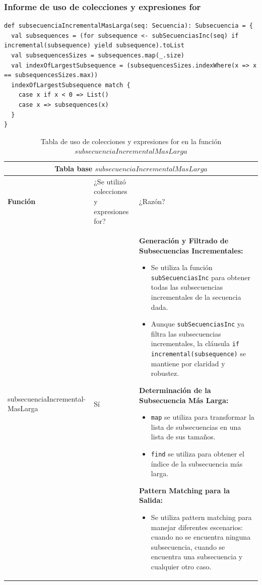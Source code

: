 \documentclass[12pt, a4paper]{article}
\begin{document}
\subsubsection{Informe de uso de colecciones y expresiones for}
\begin{lstlisting}[caption=Código en Scala para la funcion subsecuenciaIncrementalMasLarga, label=lst:scala_code]
def subsecuenciaIncrementalMasLarga(seq: Secuencia): Subsecuencia = {
  val subsequences = (for subsequence <- subSecuenciasInc(seq) if incremental(subsequence) yield subsequence).toList
  val subsequencesSizes = subsequences.map(_.size) 
  val indexOfLargestSubsequence = (subsequencesSizes.indexWhere(x => x == subsequencesSizes.max))
  indexOfLargestSubsequence match {
    case x if x < 0 => List()
    case x => subsequences(x)
  }
}
                      \end{lstlisting}
\begin{table}[H]
    \scriptsize
   \begin{tabular}{ |p{4cm}|p{3cm}|p{5.5cm}|  }
    \hline
    \multicolumn{3}{|c|}{Tabla base $subsecuenciaIncrementalMasLarga$} \\
    \hline
    \textbf{Función}& ¿Se utilizó colecciones y expresiones for?  & ¿Razón?\\
    \hline
     subsecuenciaIncremental-MasLarga & Sí &  
      \textbf{Generación y Filtrado de Subsecuencias Incrementales:}
      \begin{itemize}
          \item Se utiliza la función \texttt{subSecuenciasInc} para obtener todas las subsecuencias incrementales de la secuencia dada.
          \item Aunque \texttt{subSecuenciasInc} ya filtra las subsecuencias incrementales, la cláusula \texttt{if incremental(subsequence)} se mantiene por claridad y robustez.
      \end{itemize}
      
       \textbf{Determinación de la Subsecuencia Más Larga:}
      \begin{itemize}
          \item \texttt{map} se utiliza para transformar la lista de subsecuencias en una lista de sus tamaños.
          \item \texttt{find} se utiliza para obtener el índice de la subsecuencia más larga.
      \end{itemize}
  
       \textbf{Pattern Matching para la Salida:}
      \begin{itemize}
          \item Se utiliza pattern matching para manejar diferentes escenarios: cuando no se encuentra ninguna subsecuencia, cuando se encuentra una subsecuencia y cualquier otro caso.
      \end{itemize}
  \\
     \hline
   \end{tabular}
  
   \centering
   \caption{Tabla de uso de colecciones y expresiones for en la función $subsecuenciaIncrementalMasLarga$}

   \end{table}
\end{document}
